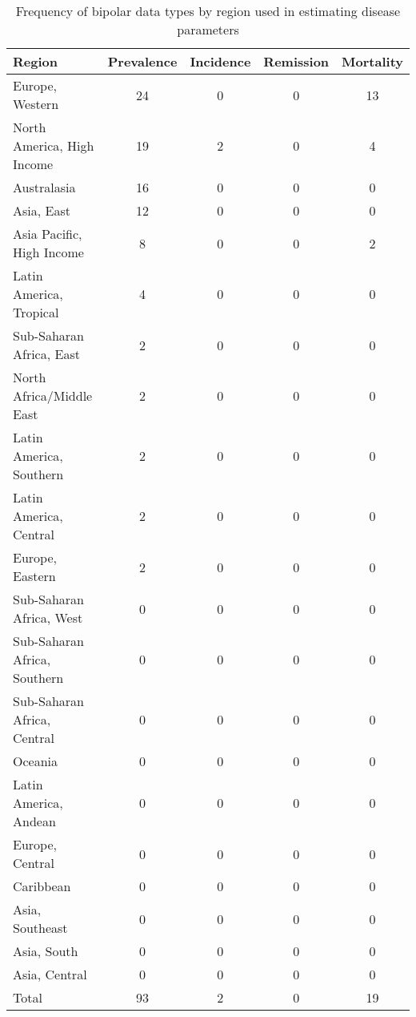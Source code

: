 \begin{table}[h]
    \begin{center}
        \caption{ Frequency of bipolar data types by region used in estimating disease parameters}
        \label{tab:bipolar_data}
        \begin{tabular}{|l|c|c|c|c|}
            \hline
                Region & Prevalence & Incidence & Remission & Mortality \\
            \hline
                Europe, Western & 24 & 0 & 0 & 13 \\
                North America, High Income & 19 & 2 & 0 & 4 \\
                Australasia & 16 & 0 & 0 & 0 \\
                Asia, East & 12 & 0 & 0 & 0 \\
                Asia Pacific, High Income & 8 & 0 & 0 & 2 \\
                Latin America, Tropical & 4 & 0 & 0 & 0 \\
                Sub-Saharan Africa, East & 2 & 0 & 0 & 0 \\
                North Africa/Middle East & 2 & 0 & 0 & 0 \\
                Latin America, Southern & 2 & 0 & 0 & 0 \\
                Latin America, Central & 2 & 0 & 0 & 0 \\
                Europe, Eastern & 2 & 0 & 0 & 0 \\
                Sub-Saharan Africa, West & 0 & 0 & 0 & 0 \\
                Sub-Saharan Africa, Southern & 0 & 0 & 0 & 0 \\
                Sub-Saharan Africa, Central & 0 & 0 & 0 & 0 \\
                Oceania & 0 & 0 & 0 & 0 \\
                Latin America, Andean & 0 & 0 & 0 & 0 \\
                Europe, Central & 0 & 0 & 0 & 0 \\
                Caribbean & 0 & 0 & 0 & 0 \\
                Asia, Southeast & 0 & 0 & 0 & 0 \\
                Asia, South & 0 & 0 & 0 & 0 \\
                Asia, Central & 0 & 0 & 0 & 0 \\
                Total & 93 & 2 & 0 & 19 \\
            \hline
        \end{tabular}
        \end{center}
    \end{table}

